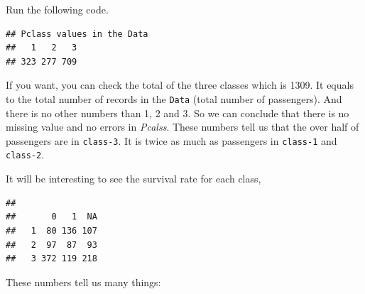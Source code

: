 \documentclass[
]{book}
\newenvironment{Shaded}{\begin{snugshade}}{\end{snugshade}}
\newcommand{\CommentTok}[1]{\textcolor[rgb]{0.56,0.35,0.01}{\textit{#1}}}
\newcommand{\DataTypeTok}[1]{\textcolor[rgb]{0.13,0.29,0.53}{#1}}
\newcommand{\KeywordTok}[1]{\textcolor[rgb]{0.13,0.29,0.53}{\textbf{#1}}}
\newcommand{\NormalTok}[1]{#1}
\newcommand{\OperatorTok}[1]{\textcolor[rgb]{0.81,0.36,0.00}{\textbf{#1}}}
\newcommand{\StringTok}[1]{\textcolor[rgb]{0.31,0.60,0.02}{#1}}
\begin{document}
Run the following code.

\begin{Shaded}
\end{Shaded}

\begin{verbatim}
## Pclass values in the Data
##   1   2   3 
## 323 277 709
\end{verbatim}

If you want, you can check the total of the three classes which is 1309. It equals to the total number of records in the \texttt{Data} (total number of passengers). And there is no other numbers than 1, 2 and 3. So we can conclude that there is no missing value and no errors in \emph{Pcalss}. These numbers tell us that the over half of passengers are in \texttt{class-3}. It is twice as much as passengers in \texttt{class-1} and \texttt{class-2}.

It will be interesting to see the survival rate for each class,

\begin{Shaded}
\end{Shaded}

\begin{verbatim}
##    
##       0   1  NA
##   1  80 136 107
##   2  97  87  93
##   3 372 119 218
\end{verbatim}

These numbers tell us many things:
\end{document}
